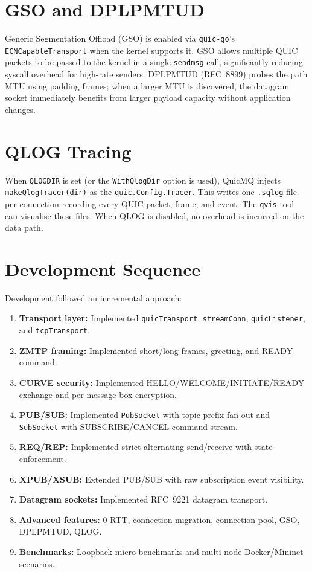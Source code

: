 \documentclass[12pt, a4paper, oneside]{report}
\begin{document}
\section{GSO and DPLPMTUD}
\label{sec:gso-impl}

Generic Segmentation Offload (GSO) is enabled via \texttt{quic-go}'s \texttt{ECNCapableTransport} when the kernel supports it. GSO allows multiple QUIC packets to be passed to the kernel in a single \texttt{sendmsg} call, significantly reducing syscall overhead for high-rate senders. DPLPMTUD (RFC~8899) probes the path MTU using padding frames; when a larger MTU is discovered, the datagram socket immediately benefits from larger payload capacity without application changes.

\section{QLOG Tracing}
\label{sec:qlog-impl}

When \texttt{QLOGDIR} is set (or the \texttt{WithQlogDir} option is used), QuicMQ injects \texttt{makeQlogTracer(dir)} as the \texttt{quic.Config.Tracer}. This writes one \texttt{.sqlog} file per connection recording every QUIC packet, frame, and event. The \texttt{qvis} tool \cite{qvis} can visualise these files. When QLOG is disabled, no overhead is incurred on the data path.

\section{Development Sequence}
\label{sec:dev-steps}

Development followed an incremental approach:

\begin{enumerate}
  \item \textbf{Transport layer:} Implemented \texttt{quicTransport}, \texttt{streamConn}, \texttt{quicListener}, and \texttt{tcpTransport}.
  \item \textbf{ZMTP framing:} Implemented short/long frames, greeting, and READY command.
  \item \textbf{CURVE security:} Implemented HELLO/WELCOME/INITIATE/READY exchange and per-message box encryption.
  \item \textbf{PUB/SUB:} Implemented \texttt{PubSocket} with topic prefix fan-out and \texttt{SubSocket} with SUBSCRIBE/CANCEL command stream.
  \item \textbf{REQ/REP:} Implemented strict alternating send/receive with state enforcement.
  \item \textbf{XPUB/XSUB:} Extended PUB/SUB with raw subscription event visibility.
  \item \textbf{Datagram sockets:} Implemented RFC~9221 datagram transport.
  \item \textbf{Advanced features:} 0-RTT, connection migration, connection pool, GSO, DPLPMTUD, QLOG.
  \item \textbf{Benchmarks:} Loopback micro-benchmarks and multi-node Docker/Mininet scenarios.
\end{enumerate}
\end{document}
